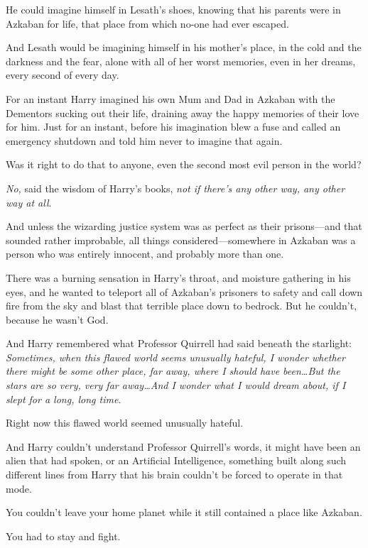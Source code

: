 He could imagine himself in Lesath’s shoes, knowing that his parents were in Azkaban for life, that place from which no-one had ever escaped.

And Lesath would be imagining himself in his mother’s place, in the cold and the darkness and the fear, alone with all of her worst memories, even in her dreams, every second of every day.

For an instant Harry imagined his own Mum and Dad in Azkaban with the Dementors sucking out their life, draining away the happy memories of their love for him. Just for an instant, before his imagination blew a fuse and called an emergency shutdown and told him never to imagine that again.

Was it right to do that to anyone, even the second most evil person in the world?

\emph{No,} said the wisdom of Harry’s books, \emph{not if there’s any other way, any other way at all}.

And unless the wizarding justice system was as perfect as their prisons—and that sounded rather improbable, all things considered—somewhere in Azkaban was a person who was entirely innocent, and probably more than one.

There was a burning sensation in Harry’s throat, and moisture gathering in his eyes, and he wanted to teleport all of Azkaban’s prisoners to safety and call down fire from the sky and blast that terrible place down to bedrock. But he couldn’t, because he wasn’t God.

And Harry remembered what Professor Quirrell had said beneath the starlight: \emph{Sometimes, when this flawed world seems unusually hateful, I wonder whether there might be some other place, far away, where I should have been…But the stars are so very, very far away…And I wonder what I would dream about, if I slept for a long, long time.}

Right now this flawed world seemed unusually hateful.

And Harry couldn’t understand Professor Quirrell’s words, it might have been an alien that had spoken, or an Artificial Intelligence, something built along such different lines from Harry that his brain couldn’t be forced to operate in that mode.

You couldn’t leave your home planet while it still contained a place like Azkaban.

You had to stay and fight.

